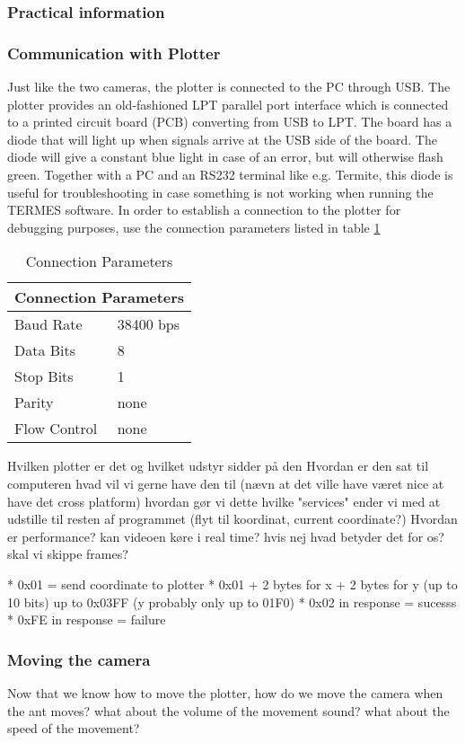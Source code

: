 \subsubsection{Practical information} \mbox{}\par

\subsubsection{Communication with Plotter} \mbox{}\par
Just like the two cameras, the plotter is connected to the PC through USB. The plotter provides an old-fashioned LPT parallel port interface which is connected to a printed circuit board (PCB) converting from USB to LPT. The board has a diode that will light up when signals arrive at the USB side of the board. The diode will give a constant blue light in case of an error, but will otherwise flash green. Together with a PC and an RS232 terminal like e.g. Termite, this diode is useful for troubleshooting in case something is not working when running the TERMES software. In order to establish a connection to the plotter for debugging purposes, use the connection parameters listed in table \ref{table:connparam}

\begin{table}[ht]
\centering
\renewcommand{\arraystretch}{1.1}
\setlength{\tabcolsep}{8pt}
	\begin{tabular}{ |l|l| }
  	\hline
  	\multicolumn{2}{|c|}{Connection Parameters} \\
  	\hline
  	Baud Rate & 38400 bps \\
  	Data Bits & 8 \\
  	Stop Bits & 1 \\
  	Parity & none \\
  	Flow Control & none \\
  	\hline
	\end{tabular}
	\caption{Connection Parameters}
	\label{table:connparam}
\end{table}








Hvilken plotter er det og hvilket udstyr sidder på den
Hvordan er den sat til computeren
hvad vil vi gerne have den til (nævn at det ville have været nice at have det cross platform)
hvordan gør vi dette
hvilke "services" ender vi med at udstille til resten af programmet (flyt til koordinat, current coordinate?)
Hvordan er performance? kan videoen køre i real time? hvis nej hvad betyder det for os? skal vi skippe frames?

*   0x01 = send coordinate to plotter
 *   0x01 + 2 bytes for x + 2 bytes for y (up to 10 bits) up to 0x03FF (y probably only up to 01F0)
 *   0x02 in response = sucesss
 *   0xFE in response = failure
 
\subsubsection{Moving the camera} \mbox{}\par
Now that we know how to move the plotter, how do we move the camera when the ant moves?
what about the volume of the movement sound?
what about the speed of the movement?

